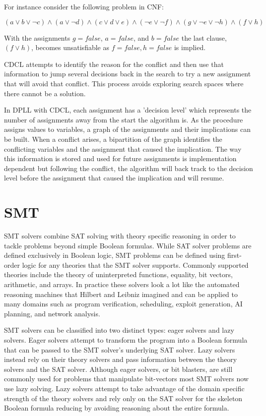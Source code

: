 \documentclass[]{final_report}
\begin{document}
For instance consider the following problem in CNF:

$(a \lor b \lor \lnot c) \land (a \lor \lnot d) \land (c \lor d \lor e) \land (\lnot e \lor \lnot f ) \land (g \lor \lnot e \lor \lnot h) \land (f \lor h)$

With the assignments $g = false$, $a = false$, and $b = false$ the last clause, $ (f \lor h) $,  becomes unsatisfiable as $ f = false, h = false$ is implied.

CDCL attempts to identify the reason for the conflict and then use that information to jump several decisions back in the search to try a new assignment that will avoid that conflict. This process avoids exploring search spaces where there cannot be a solution. 

In DPLL with CDCL, each assignment has a 'decision level' which represents the number of assignments away from the start the algorithm is. As the procedure assigns values to variables, a graph of the assignments and their implications can be built. When a conflict arises, a bipartition of the graph identifies the conflicting variables and the assignment that caused the implication. The way this information is stored and used for future assignments is implementation dependent but following the conflict, the algorithm will back track to the decision level before the assignment that caused the implication and will resume.

\section{SMT}

SMT solvers combine SAT solving with theory specific reasoning in order to tackle problems beyond simple Boolean formulas. While SAT solver problems are defined exclusively in Boolean logic, SMT problems can be defined using first-order logic for any theories that the SMT solver supports. Commonly supported theories include the theory of uninterpreted functions, equality, bit vectors,  arithmetic, and arrays. In practice these solvers look a lot like the automated reasoning machines that Hilbert and Leibniz imagined and can be applied to many domains such as program verification, scheduling, exploit generation, AI planning, and network analysis.

SMT solvers can be classified into two distinct types: eager solvers and lazy solvers. Eager solvers attempt to transform the program into a Boolean formula that can be passed to the SMT solver's underlying SAT solver. Lazy solvers instead rely on their theory solvers and pass information between the theory solvers and the SAT solver. Although eager solvers, or bit blasters, are still commonly used for problems that manipulate bit-vectors most SMT solvers now use lazy solving. Lazy solvers attempt to take advantage of the domain specific strength of the theory solvers and rely only on the SAT solver for the skeleton Boolean formula reducing by avoiding reasoning about the entire formula.  ~\cite{sattosmt} ~\cite{smtdpplt}
\end{document}
